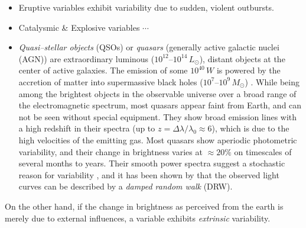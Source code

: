 \begin{itemize}
\item Eruptive variables exhibit variability due to sudden, violent outbursts.
\item Catalysmic \& Explosive variables $\cdots$

\item \emph{Quasi--stellar objects} (QSOs) or \emph{quasars} (generally active galactic nuclei (AGN)) are extraordinary luminous ($10^{12}$--$10^{14} \, \unit{L_\odot}$), distant objects at the center of active galaxies. The emission of some $10^{40} \, \unit{W}$ is powered by the accretion of matter into supermassive black holes ($10^7$--$10^9 \, \unit{M_\odot}$) \citep{hanslmeier2007}. While being among the brightest objects in the observable universe over a broad range of the electromagnetic spectrum, most quasars appear faint from Earth, and can not be seen without special equipment. They show broad emission lines with a high redshift in their spectra (up to $z  = \Delta \lambda / \lambda_0 \approx 6$), which is due to the high velocities of the emitting gas. Most quasars show aperiodic photometric variability, and their change in brightness varies at $\approx 20\%$ on timescales of several months to years. Their smooth power spectra suggest a stochastic reason for variability \citep{macleod2010}, and it has been shown by \citet{kozlowski2010} that the observed light curves can be described by a \emph{damped random walk} (DRW).


\end{itemize}

On the other hand, if the change in brightness as perceived from the earth is merely due to external influences, a variable exhibits \emph{extrinsic} variability.

